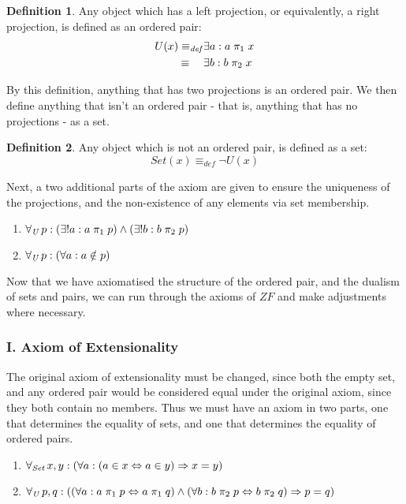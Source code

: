\documentclass[11pt]{article}
\newcommand{\all}[1]{\forall_{\mathit{#1}}\hspace{0.5mm}}
\newcommand{\eqdef}{\equiv_\mathit{def}}
\newcommand{\pleft}{\mathrel{\pi_1}}
\newcommand{\pright}{\mathrel{\pi_2}}
\theoremstyle{definition}
\theoremstyle{theorem}
\theoremstyle{lemma}
\newtheorem{definition}{Definition}[section]
\begin{document}
\begin{definition} Any object which has a left projection, or equivalently, a right projection, is defined as an ordered pair:
\begin{align*}
  U(x) \eqdef &\exists a: a\pleft x \\
       \equiv\hspace{4.5mm}&\exists b: b\pright x
\end{align*}
\end{definition}
\noindent
By this definition, anything that has two projections is an ordered pair. We then define anything that isn't an ordered pair - that is, anything that has no projections - as a set.
\begin{definition} Any object which is not an ordered pair, is defined as a set:
$$\mathit{Set}(x) \eqdef \neg\mathit{U}(x)$$
\end{definition}
\noindent
Next, a two additional parts of the axiom are given to ensure the uniqueness of the projections, and the non-existence of any elements via set membership.
\begin{enumerate}[resume, label=(\roman*)]
  \item $\all{U} p: (\exists!a: a\pleft p) \wedge (\exists!b: b\pright p)$
  \item $\all{U} p: (\forall a: a\notin p)$
\end{enumerate}
Now that we have axiomatised the structure of the ordered pair, and the dualism of sets and pairs, we can run through the axioms of $\mathit{ZF}$ and make adjustments where necessary.

\subsubsection*{I. Axiom of Extensionality}
The original axiom of extensionality must be changed, since both the empty set, and any ordered pair would be considered equal under the original axiom, since they both contain no members.
Thus we must have an axiom in two parts, one that determines the equality of sets, and one that determines the equality of ordered pairs.
\begin{enumerate}[label=(\roman*)]
\item $\all{Set} x,y:
        (\forall a:
          (a\in x \Leftrightarrow a\in y) \Rightarrow x=y)$
\item $\all{U} p,q: ((\forall a: a\pleft p \Leftrightarrow a\pleft q)
             \wedge (\forall b: b\pright p \Leftrightarrow b\pright q)
             \Rightarrow p=q)$
\end{enumerate}
\end{document}
